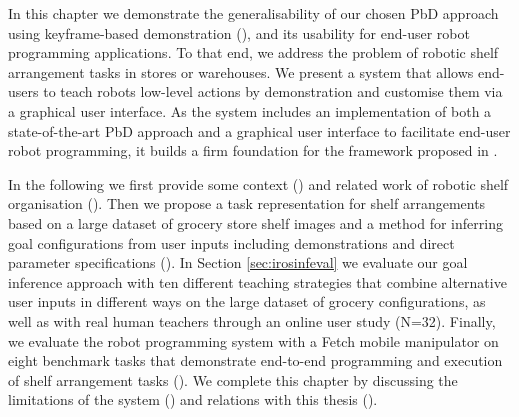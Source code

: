 In this chapter we demonstrate the generalisability of our chosen PbD approach using keyframe-based demonstration (\cite{akgun12klfd}), and its usability for end-user robot programming applications.
To that end, we address the problem of robotic shelf arrangement tasks in stores or warehouses. 
We present a system that allows end-users to teach robots low-level actions by demonstration and customise them via a graphical user interface.
As the system includes an implementation of both a state-of-the-art PbD approach and a graphical user interface to facilitate end-user robot programming, it builds a firm foundation for the framework proposed in .

In the following we first provide some context () and related work of robotic shelf organisation ().
Then we propose a task representation for shelf arrangements based on a large dataset of grocery store shelf images and a method for inferring goal configurations from user inputs including demonstrations and direct parameter specifications ().
In Section \ref{sec:irosinfeval} we evaluate our goal inference approach with ten different teaching strategies that combine alternative user inputs in different ways on the large dataset of grocery configurations, as well as with real human teachers through an online user study (N=32).
Finally, we evaluate the robot programming system with a Fetch mobile manipulator on eight benchmark tasks that demonstrate end-to-end programming and execution of shelf arrangement tasks ().
We complete this chapter by discussing the limitations of the system () and relations with this thesis ().


